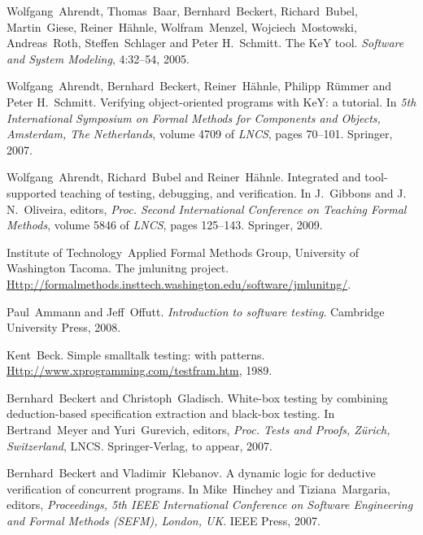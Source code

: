 \documentclass{article}
\newcommand{\tmtextit}[1]{{\itshape{#1}}}
\begin{document}
\begin{thebibliography}{10}
  Wolfgang~Ahrendt, Thomas~Baar, Bernhard~Beckert,
  Richard~Bubel, Martin~Giese, Reiner~H{\"a}hnle, Wolfram~Menzel,
  Wojciech~Mostowski, Andreas~Roth, Steffen~Schlager and Peter
  H.~Schmitt.{\newblock} The KeY tool.{\newblock} \tmtextit{Software and
  System Modeling}, 4:32--54, 2005.{\newblock}
  
  Wolfgang~Ahrendt, Bernhard~Beckert,
  Reiner~H{\"a}hnle, Philipp~R{\"u}mmer and Peter H.~Schmitt.{\newblock}
  Verifying object-oriented programs with KeY: a tutorial.{\newblock} In
  \tmtextit{5th International Symposium on Formal Methods for Components and
  Objects, Amsterdam, The Netherlands}, volume 4709 of \tmtextit{LNCS}, pages
  70--101. Springer, 2007.{\newblock}
  
  Wolfgang~Ahrendt, Richard~Bubel and
  Reiner~H{\"a}hnle.{\newblock} Integrated and tool-supported teaching of
  testing, debugging, and verification.{\newblock} In J.~Gibbons and J.
  N.~Oliveira, editors, \tmtextit{Proc. Second International Conference on
  Teaching Formal Methods}, volume 5846 of \tmtextit{LNCS}, pages 125--143.
  Springer, 2009.{\newblock}
  
  Institute of Technology~Applied Formal Methods
  Group, University of Washington Tacoma.{\newblock} The jmlunitng
  project.{\newblock}
  {\url{Http://formalmethods.insttech.washington.edu/software/jmlunitng/}}.{\newblock}
  
  Paul~Ammann and Jeff~Offutt.{\newblock}
  \tmtextit{Introduction to software testing}.{\newblock} Cambridge University
  Press, 2008.{\newblock}
  
  Kent~Beck.{\newblock} Simple smalltalk testing: with
  patterns.{\newblock} {\url{Http://www.xprogramming.com/testfram.htm}},
  1989.{\newblock}
  
  Bernhard~Beckert and
  Christoph~Gladisch.{\newblock} White-box testing by combining
  deduction-based specification extraction and black-box testing.{\newblock}
  In Bertrand~Meyer and Yuri~Gurevich, editors, \tmtextit{Proc. Tests and
  Proofs, Z{\"u}rich, Switzerland}, LNCS. Springer-Verlag, to appear,
  2007.{\newblock}
  
  Bernhard~Beckert and
  Vladimir~Klebanov.{\newblock} A dynamic logic for deductive verification of
  concurrent programs.{\newblock} In Mike~Hinchey and Tiziana~Margaria,
  editors, \tmtextit{Proceedings, 5th IEEE International Conference on
  Software Engineering and Formal Methods (SEFM), London, UK}. IEEE Press,
  2007.{\newblock}
  

\end{thebibliography}
\end{document}
